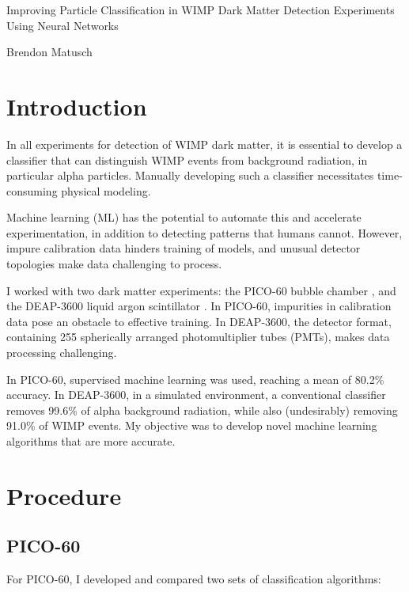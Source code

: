 \documentclass[12pt]{article}
\begin{document}
\begin{center}
    \begin{LARGE}
        Improving Particle Classification in WIMP Dark Matter Detection Experiments Using Neural Networks
    \end{LARGE}

    Brendon Matusch
\end{center}

\section{Introduction}

In all experiments for detection of WIMP dark matter, it is essential to develop a classifier that can distinguish WIMP events from background radiation, in particular alpha particles. Manually developing such a classifier necessitates time-consuming physical modeling.

Machine learning (ML) has the potential to automate this and accelerate experimentation, in addition to detecting patterns that humans cannot. However, impure calibration data hinders training of models, and unusual detector topologies make data challenging to process.

I worked with two dark matter experiments: the PICO-60 bubble chamber \cite{pico}, and the DEAP-3600 liquid argon scintillator \cite{deap}. In PICO-60, impurities in calibration data pose an obstacle to effective training. In DEAP-3600, the detector format, containing 255 spherically arranged photomultiplier tubes (PMTs), makes data processing challenging.

In PICO-60, supervised machine learning was used, reaching a mean of 80.2\% accuracy. In DEAP-3600, in a simulated environment, a conventional classifier removes 99.6\% of alpha background radiation, while also (undesirably) removing 91.0\% of WIMP events. My objective was to develop novel machine learning algorithms that are more accurate.

\section{Procedure}

\subsection{PICO-60}

For PICO-60, I developed and compared two sets of classification algorithms:
\end{document}
